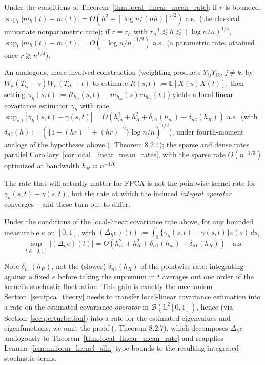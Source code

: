 \begin{corollary}
\label{cor:local_linear_mean_rates}
Under the conditions of Theorem~\ref{thm:local_linear_mean_rate}: if $r$ is
bounded, $\sup_t|m_h(t)-m(t)| = O(h^2+[\log n/(nh)]^{1/2})$ a.s.\ (the
classical univariate nonparametric rate); if $r=r_n$ with $r_n^{-1}
\lesssim h\lesssim(\log n/n)^{1/4}$, $\sup_t|m_h(t)-m(t)| = O([\log n/n]
^{1/2})$ a.s.\ (a parametric rate, attained once $r\gtrsim n^{1/4}$).
\end{corollary}

An analogous, more involved construction (weighting products $Y_{ij}Y_{ik}$,
$j\neq k$, by $W_h(T_{ij}-s)W_h(T_{ik}-t)$ to estimate $R(s,t):=\mathbb{E}
[X(s)X(t)]$, then setting $\gamma_h(s,t):=R_{h_R}(s,t)-m_{h_m}(s)m_{h_m}
(t)$) yields a local-linear covariance estimator $\gamma_h$ with rate
$\sup_{s,t}|\gamma_h(s,t)-\gamma(s,t)| = O(h_m^2+h_R^2+\delta_{n1}(h_m)+
\delta_{n2}(h_R))$ a.s.\ (with $\delta_{n2}(h):=(\{1+(hr)^{-1}+(hr)^{-2}\}
\log n/n)^{1/2}$), under fourth-moment analogs of the hypotheses above
(\cite{hsingeubank2015}, Theorem 8.2.4); the sparse and dense rates parallel
Corollary~\ref{cor:local_linear_mean_rates}, with the sparse rate
$O(n^{-1/3})$ optimized at bandwidth $\widehat{h}_R\asymp n^{-1/6}$.

The rate that will actually matter for FPCA is not the pointwise kernel
rate for $\gamma_h(s,t)-\gamma(s,t)$, but the rate at which the induced
\emph{integral operator} converges -- and these turn out to differ.

\begin{theorem}
\label{thm:local_linear_operator_rate}
Under the conditions of the local-linear covariance rate above, for any
bounded measurable $e$ on $[0,1]$, with $(\Delta_he)(t):=\int_0^1\{\gamma_h
(s,t)-\gamma(s,t)\}e(s)\,ds$,
\begin{equation}
\sup_{t\in[0,1]}|(\Delta_he)(t)| = O(h_m^2+h_R^2+\delta_{n1}(h_m)+
\delta_{n1}(h_R)) \quad\text{a.s.}
\label{eq:local_linear_operator_rate}
\end{equation}
\end{theorem}

Note $\delta_{n1}(h_R)$, not the (slower) $\delta_{n2}(h_R)$ of the
pointwise rate: integrating against a fixed $e$ before taking the supremum
in $t$ averages out one order of the kernel's stochastic fluctuation. This
gain is exactly the mechanism Section~\ref{sec:fpca_theory} needs to
transfer local-linear covariance estimation into a rate on the estimated
covariance \emph{operator} in $\mathcal{B}(\mathbb{L}^2[0,1])$, hence (via
Section~\ref{sec:perturbation}) into a rate for the estimated eigenvalues
and eigenfunctions; we omit the proof (\cite{hsingeubank2015}, Theorem
8.2.7), which decomposes $\Delta_he$ analogously to
Theorem~\ref{thm:local_linear_mean_rate} and reapplies
Lemma~\ref{lem:uniform_kernel_slln}-type bounds to the resulting
integrated stochastic terms.


